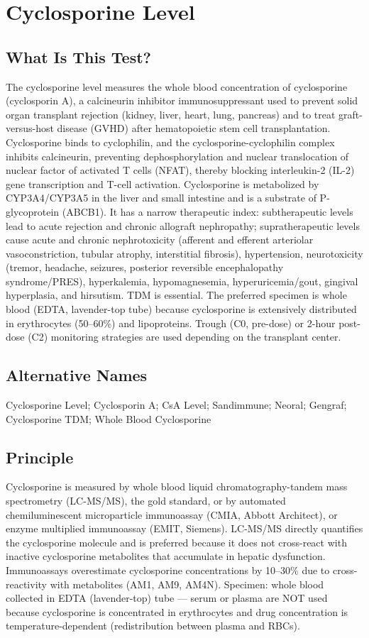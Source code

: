 \chapter{Cyclosporine Level}

\section*{What Is This Test?}
The cyclosporine level measures the whole blood concentration of cyclosporine (cyclosporin A), a calcineurin inhibitor immunosuppressant used to prevent solid organ transplant rejection (kidney, liver, heart, lung, pancreas) and to treat graft-versus-host disease (GVHD) after hematopoietic stem cell transplantation. Cyclosporine binds to cyclophilin, and the cyclosporine-cyclophilin complex inhibits calcineurin, preventing dephosphorylation and nuclear translocation of nuclear factor of activated T cells (NFAT), thereby blocking interleukin-2 (IL-2) gene transcription and T-cell activation. Cyclosporine is metabolized by CYP3A4/CYP3A5 in the liver and small intestine and is a substrate of P-glycoprotein (ABCB1). It has a narrow therapeutic index: subtherapeutic levels lead to acute rejection and chronic allograft nephropathy; supratherapeutic levels cause acute and chronic nephrotoxicity (afferent and efferent arteriolar vasoconstriction, tubular atrophy, interstitial fibrosis), hypertension, neurotoxicity (tremor, headache, seizures, posterior reversible encephalopathy syndrome/PRES), hyperkalemia, hypomagnesemia, hyperuricemia/gout, gingival hyperplasia, and hirsutism. TDM is essential. The preferred specimen is whole blood (EDTA, lavender-top tube) because cyclosporine is extensively distributed in erythrocytes (50--60\%) and lipoproteins. Trough (C0, pre-dose) or 2-hour post-dose (C2) monitoring strategies are used depending on the transplant center.

\section*{Alternative Names}
Cyclosporine Level; Cyclosporin A; CsA Level; Sandimmune; Neoral; Gengraf; Cyclosporine TDM; Whole Blood Cyclosporine

\section*{Principle}
Cyclosporine is measured by whole blood liquid chromatography-tandem mass spectrometry (LC-MS/MS), the gold standard, or by automated chemiluminescent microparticle immunoassay (CMIA, Abbott Architect), or enzyme multiplied immunoassay (EMIT, Siemens). LC-MS/MS directly quantifies the cyclosporine molecule and is preferred because it does not cross-react with inactive cyclosporine metabolites that accumulate in hepatic dysfunction. Immunoassays overestimate cyclosporine concentrations by 10--30\% due to cross-reactivity with metabolites (AM1, AM9, AM4N). Specimen: whole blood collected in EDTA (lavender-top) tube --- serum or plasma are NOT used because cyclosporine is concentrated in erythrocytes and drug concentration is temperature-dependent (redistribution between plasma and RBCs).

